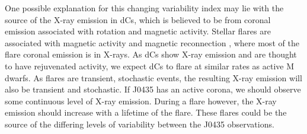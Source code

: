 \documentclass[twocolumn, tighten, times, astrosymb]{aastex631}
\begin{document}
One possible explanation for this changing variability index may lie with the source of the X-ray emission in dCs, which is believed to be from coronal emission associated with rotation and magnetic activity. Stellar flares are associated with magnetic activity and magnetic reconnection \citep{Pettersen1989}, where most of the flare coronal emission is in X-rays. As dCs show X-ray emission and are thought to have rejuvenated activity, we expect dCs to flare at similar rates as active M dwarfs. As flares are transient, stochastic events, the resulting X-ray emission will also be transient and stochastic. If J0435 has an active corona, we should observe some continuous level of X-ray emission. During a flare however, the X-ray emission should increase with a lifetime of the flare. These flares could be the source of the differing levels of variability between the J0435 observations. 




\end{document}
